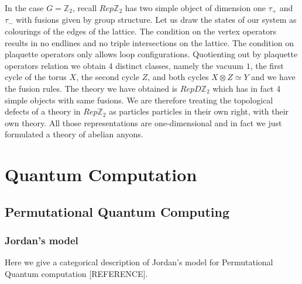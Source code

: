 \documentclass{article}
\newenvironment{example}[1][Example]{\begin{trivlist}
\item[\hskip \labelsep {\bfseries #1}]}{\end{trivlist}}
\begin{document}
\begin{example}
In the case $G=\mathbb{Z}_2$, recall $Rep\mathbb{Z}_2$ has two simple object of dimension one $\tau_+$ and $\tau_-$ with fusions given by group structure. Let us draw the states of our system as colourings of the edges of the lattice. The condition on the vertex operators results in no endlines and no triple intersections on the lattice. The condition on plaquette operators only allows loop configurations. Quotienting out by plaquette operators relation we obtain 4 distinct classes, namely the vacuum $1$, the first cycle of the torus $X$, the second cycle $Z$, and both cycles $X \otimes Z \simeq Y$ and we have the fusion rules. The theory we have obtained is $RepD\mathbb{Z}_2$ which has in fact 4 simple objects with same fusions. We are therefore treating the topological defects of a theory in $Rep\mathbb{Z}_2$ as particles particles in their own right, with their own theory. All those representations are one-dimensional and in fact we just formulated a theory of abelian anyons.
\end{example}



\section{Quantum Computation}


\subsection{Permutational Quantum Computing}
\subsubsection{Jordan's model}
Here we give a categorical description of Jordan's model for Permutational Quantum computation [REFERENCE].
\end{document}
